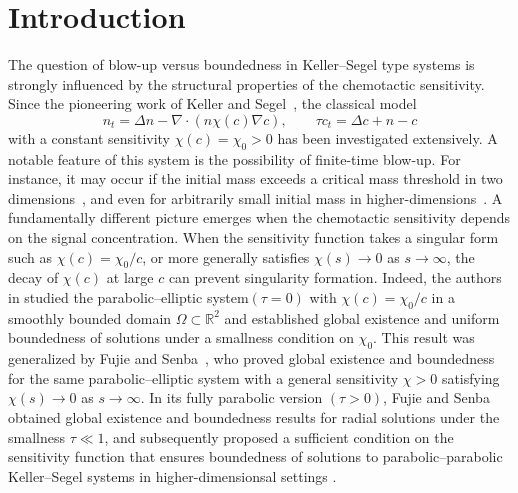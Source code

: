 \documentclass{amsart}
\numberwithin{equation}{section}
\begin{document}



\section{Introduction}


The question of blow-up versus boundedness in Keller--Segel type systems is strongly influenced by the structural properties of the chemotactic sensitivity. 
Since the pioneering work of Keller and Segel~\cite{Keller_Segel_1970}, the classical model
\[
n_{t} = \Delta n -   \nabla \cdot (n\chi(c)\nabla c), \qquad \tau c_{t}=\Delta c + n -c
\]
with a constant sensitivity 
$\chi(c)=\chi_0>0$
 has been investigated extensively. A notable feature of this system is the possibility of finite-time blow-up. For instance, it may occur if the initial mass exceeds a critical mass threshold in two dimensions~\cite{Jager_Luckhaus_1992,Nagai_Senba_Yoshida_1997,Senba_Suzuki_2001}, and  even for arbitrarily small initial mass  in higher-dimensions~\cite{Nagai_2000, Herrero_Medina_Velazquez_1997}.
 A fundamentally different picture emerges when the chemotactic sensitivity depends on the signal concentration. When the sensitivity function takes a singular form such as $\chi(c)=\chi_{0}/c$,
  or more generally satisfies $\chi(s)\to 0$ as $s\to\infty$,  the decay of $\chi(c)$ at large $c$ can prevent singularity formation. Indeed, the authors in \cite{Fujie_2014} studied the parabolic--elliptic system$(\tau=0)$ with $\chi(c)=\chi_{0}/ c$
in a smoothly bounded domain $\Omega\subset\mathbb{R}^{2}$ and established global existence and uniform boundedness of solutions under a smallness condition on $\chi_{0}$. This result was generalized by Fujie and Senba~\cite{FujieSenba_DCDSB_2016}, who proved global existence and boundedness for the same parabolic--elliptic system with a general sensitivity $\chi>0$ satisfying  $\chi(s)\to 0$ as $s\to\infty$. 
In its fully parabolic version $(\tau>0)$, Fujie and Senba~\cite{fujie2016global} obtained global existence and boundedness results for radial solutions under the smallness $\tau\ll 1$, and subsequently proposed a sufficient condition on the sensitivity function that ensures boundedness of solutions to parabolic--parabolic Keller--Segel systems in higher-dimensionsal settings \cite{FujieSenba_Nonlinearity_2018}. 
\end{document}
